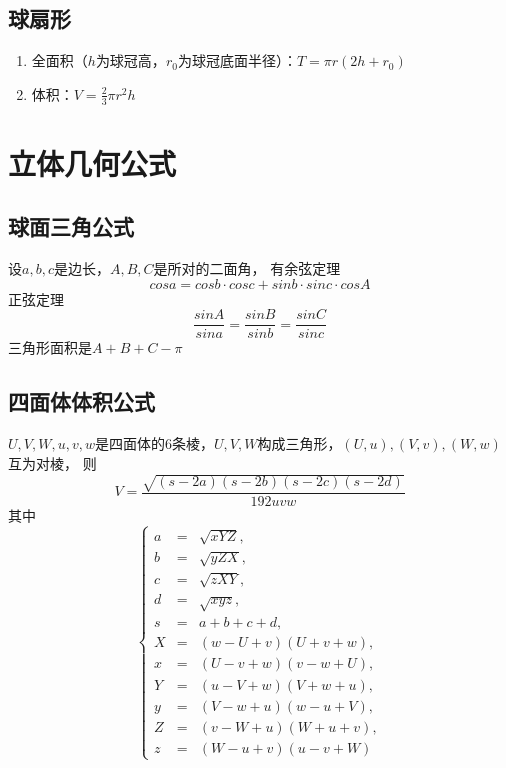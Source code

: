 \begin{spacing}{0.1}
\subsection*{球扇形}
\begin{spacing}{0.1}
	\begin{enumerate}
		\item 全面积（$h$为球冠高，$r_0$为球冠底面半径）：$\displaystyle T=\pi r(2h+r_0)$
		\item 体积：$\displaystyle V=\frac{2}{3}\pi r^2h$
	\end{enumerate}
\end{spacing}
\section{立体几何公式}
\subsection*{球面三角公式}
	设$a, b, c$是边长，$A, B, C$是所对的二面角，
	有余弦定理$$cos a = cos b \cdot cos c + sin b \cdot sin c \cdot cos A$$
	正弦定理$$\frac{sin A}{sin a} = \frac{sin B}{sin b} = \frac{sin C}{sin c}$$
	三角形面积是$A + B + C - \pi$
\subsection*{四面体体积公式}
	$U, V, W, u, v, w$是四面体的$6$条棱，$U, V, W$构成三角形，$(U, u), (V, v), (W, w)$互为对棱，
	则$$V = \frac{\sqrt{(s - 2a)(s - 2b)(s - 2c)(s - 2d)}}{192 uvw}$$
	其中$$\left\{\begin{array}{lll}
			a & = & \sqrt{xYZ}, \\
			b & = & \sqrt{yZX}, \\
			c & = & \sqrt{zXY}, \\
			d & = & \sqrt{xyz}, \\
			s & = & a + b + c + d, \\
			X & = & (w - U + v)(U + v + w), \\
			x & = & (U - v + w)(v - w + U), \\
			Y & = & (u - V + w)(V + w + u), \\
			y & = & (V - w + u)(w - u + V), \\
			Z & = & (v - W + u)(W + u + v), \\
			z & = & (W - u + v)(u - v + W)
		\end{array}\right.$$
\end{spacing}
